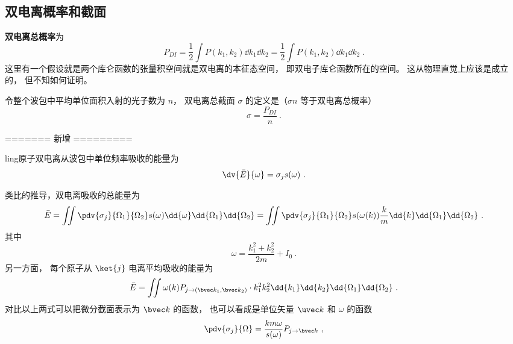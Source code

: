 \subsection{双电离概率和截面}
\textbf{双电离总概率}为
\begin{equation}\label{eq_HeAnal_14}
P_{DI} = \frac{1}{2}\int P(k_1, k_2)\dd{k_1}\dd{k_2} = \frac{1}{2}\int P(k_1, k_2)\dd{k_1}\dd{k_2}~.
\end{equation}
这里有一个假设就是两个库仑函数的张量积空间就是双电离的本征态空间， 即双电子库仑函数所在的空间。 这从物理直觉上应该是成立的， 但不知如何证明。

令整个波包中平均单位面积入射的光子数为 $n$， 双电离总截面 $\sigma$ 的定义是（$\sigma n$ 等于双电离总概率）
\begin{equation}
\sigma = \frac{P_{DI}}{n}~.
\end{equation}

======= 新增 =========

ling原子双电离从波包中单位频率吸收的能量为
\begin{equation}
\dv{\bar E}{\omega} = \sigma_j s(\omega)~.
\end{equation}


类比的推导，双电离吸收的总能量为
\begin{equation}
\bar E = \iint \pdv{\sigma_j}{\Omega_1}{\Omega_2} s(\omega) \dd{\omega}\dd{\Omega_1}\dd{\Omega_2} = \iint \pdv{\sigma_j}{\Omega_1}{\Omega_2} s(\omega(k)) \frac{k}{m}\dd{k}\dd{\Omega_1}\dd{\Omega_2}~.
\end{equation}
其中
\begin{equation}
\omega = \frac{k_1^2+k_2^2}{2m} + I_0~.
\end{equation}
另一方面， 每个原子从 $\ket{j}$ 电离平均吸收的能量为
\begin{equation}
\bar E = \iint \omega(k) P_{j\to {(\bvec k_1,\bvec k_2)}} \cdot k_1^2k_2^2 \dd{k_1}\dd{k_2}\dd{\Omega_1}\dd{\Omega_2}~.
\end{equation}
对比以上两式可以把微分截面表示为 $\bvec k$ 的函数， 也可以看成是单位矢量 $\uvec k$ 和 $\omega$ 的函数
\begin{equation}
\pdv{\sigma_j}{\Omega} = \frac{km \omega}{s(\omega)} P_{j\to \bvec k}~,
\end{equation}

